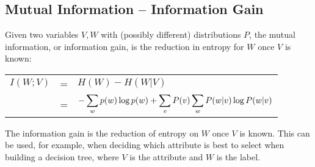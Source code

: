 \subsection{Mutual Information -- Information Gain}
\begin{definition}
Given two variables $V,W$ with (possibly different) distributions $P$, the mutual information, or information gain, is the reduction in entropy for $W$ once $V$ is known:
\begin{center}
	\begin{tabular}{rcl}
		$I(W; V)$&=&$H(W)-H(W\vert V)$\\
		&=&$-\displaystyle\sum_{w}p(w)\log{p(w)}+\displaystyle\sum_vP(v)\displaystyle\sum_wP(w\vert v)\log{P(w\vert v)}$
	\end{tabular}
\end{center}
\end{definition}
The information gain is the reduction of entropy on $W$ once $V$ is known. This can be used, for example, when deciding which attribute is best to select when building a decision tree, where $V$ is the attribute and $W$ is the label.
